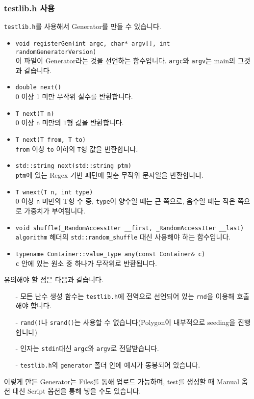 \documentclass{article}
\begin{document}
    \subsubsection{testlib.h 사용}
    \verb|testlib.h|를 사용해서 Generator를 만들 수 있습니다. 
    \begin{itemize}
        \item \verb|void registerGen(int argc, char* argv[], int randomGeneratorVersion)|\\
        이 파일이 Generator라는 것을 선언하는 함수입니다. \verb|argc|와 \verb|argv|는 main의 그것과 같습니다.
        \item \verb|double next()|\\
        0 이상 1 미만 무작위 실수를 반환합니다.
        \item \verb|T next(T n)|\\
        0 이상 \verb|n| 미만의 \verb|T|형 값을 반환합니다.
        \item \verb|T next(T from, T to)|\\
        \verb|from| 이상 \verb|to| 이하의 \verb|T|형 값을 반환합니다.
        \item \verb|std::string next(std::string ptm)|\\
        \verb|ptm|에 있는 Regex 기반 패턴에 맞춘 무작위 문자열을 반환합니다.
        \item \verb|T wnext(T n, int type)|\\
        0 이상 \verb|n| 미만의 T형 수 중, \verb|type|이 양수일 때는 큰 쪽으로, 음수일 때는 작은 쪽으로 가중치가 부여됩니다.
        \item \verb|void shuffle(_RandomAccessIter __first, _RandomAccessIter __last)|\\
        \verb|algorithm| 헤더의 \verb|std::random_shuffle| 대신 사용해야 하는 함수입니다.
        \item \verb|typename Container::value_type any(const Container& c)|\\
        \verb|c| 안에 있는 원소 중 하나가 무작위로 반환됩니다.
    \end{itemize}
    유의해야 할 점은 다음과 같습니다.
    \begin{itemize}
        \item[-] 모든 난수 생성 함수는 \verb|testlib.h|에 전역으로 선언되어 있는 \verb|rnd|을 이용해 호출해야 합니다.
        \item[-] \verb|rand()|나 \verb|srand()|는 사용할 수 없습니다(Polygon이 내부적으로 seeding을 진행합니다)
        \item[-] 인자는 \verb|stdin|대신 \verb|argc|와 \verb|argv|로 전달받습니다.
        \item[-] \verb|testlib.h|의 \verb|generator| 폴더 안에 예시가 동봉되어 있습니다.
    \end{itemize}
    이렇게 만든 Generator는 Files를 통해 업로드 가능하며, test를 생성할 때 Manual 옵션 대신 Script 옵션을 통해 넣을 수도 있습니다.
\end{document}
